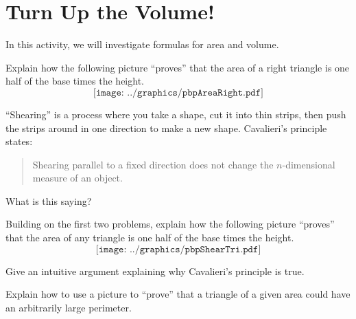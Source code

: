 \newpage
\section{Turn Up the Volume!}

In this activity, we will investigate formulas for area and
volume.


\begin{prob}
Explain how the following picture ``proves'' that the area of a right
  triangle is one half of the base times the height.
\[
\texttt{[image: ../graphics/pbpAreaRight.pdf]}
\]
\end{prob}


\begin{prob}
``Shearing'' is a process where you take a shape, cut it into thin strips, 
then push the strips around in one direction to make a new shape.  
Cavalieri's principle states:
\begin{quote}
Shearing parallel to a fixed direction does not change the
$n$-dimensional measure of an object.
\end{quote}
What is this saying?
\end{prob}




\begin{prob}
Building on the first two problems, explain how the following picture
  ``proves'' that the area of any triangle is one half of the base times the
  height.
\[
\texttt{[image: ../graphics/pbpShearTri.pdf]}
\]
\end{prob}



\begin{prob}
Give an intuitive argument explaining why Cavalieri's principle is
true.
\end{prob}


\begin{prob}
Explain how to use a picture to ``prove'' that a triangle of a given
  area could have an arbitrarily large perimeter.
\end{prob}


%
%
%

